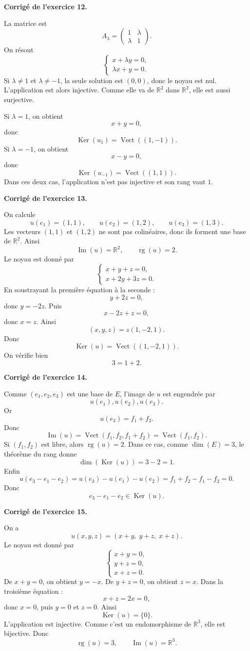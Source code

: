 \documentclass[11pt,a4paper]{article}
\newcommand{\corr}[1]{
    \vspace{0.4cm}
    \noindent\textbf{\textcolor{bleuprepa}{Corrigé de l'exercice #1.}}
    \par\vspace{0.1cm}
}
\newcommand{\R}{\mathbb{R}}
\newcommand{\Ker}{\operatorname{Ker}}
\newcommand{\Img}{\operatorname{Im}}
\newcommand{\rg}{\operatorname{rg}}
\newcommand{\Vect}{\operatorname{Vect}}
\begin{document}
\corr{12}
La matrice est
\[
A_\lambda=
\begin{pmatrix}
1&\lambda\\
\lambda&1
\end{pmatrix}.
\]
On résout
\[
\begin{cases}
x+\lambda y=0,\\
\lambda x+y=0.
\end{cases}
\]
Si $\lambda\neq 1$ et $\lambda\neq -1$, la seule solution est $(0,0)$, donc le noyau est nul. L'application est alors injective. Comme elle va de $\R^2$ dans $\R^2$, elle est aussi surjective.

Si $\lambda=1$, on obtient
\[
x+y=0,
\]
donc
\[
\Ker(u_1)=\Vect((1,-1)).
\]
Si $\lambda=-1$, on obtient
\[
x-y=0,
\]
donc
\[
\Ker(u_{-1})=\Vect((1,1)).
\]
Dans ces deux cas, l'application n'est pas injective et son rang vaut $1$.

\corr{13}
On calcule
\[
u(e_1)=(1,1),\qquad u(e_2)=(1,2),\qquad u(e_3)=(1,3).
\]
Les vecteurs $(1,1)$ et $(1,2)$ ne sont pas colinéaires, donc ils forment une base de $\R^2$. Ainsi
\[
\Img(u)=\R^2,\qquad \rg(u)=2.
\]
Le noyau est donné par
\[
\begin{cases}
x+y+z=0,\\
x+2y+3z=0.
\end{cases}
\]
En soustrayant la première équation à la seconde :
\[
y+2z=0,
\]
donc $y=-2z$. Puis
\[
x-2z+z=0,
\]
donc $x=z$. Ainsi
\[
(x,y,z)=z(1,-2,1).
\]
Donc
\[
\Ker(u)=\Vect((1,-2,1)).
\]
On vérifie bien
\[
3=1+2.
\]

\corr{14}
Comme $(e_1,e_2,e_3)$ est une base de $E$, l'image de $u$ est engendrée par
\[
u(e_1),u(e_2),u(e_3).
\]
Or
\[
u(e_3)=f_1+f_2.
\]
Donc
\[
\Img(u)=\Vect(f_1,f_2,f_1+f_2)=\Vect(f_1,f_2).
\]
Si $(f_1,f_2)$ est libre, alors $\rg(u)=2$. Dans ce cas, comme $\dim(E)=3$, le théorème du rang donne
\[
\dim(\Ker(u))=3-2=1.
\]
Enfin
\[
u(e_3-e_1-e_2)=u(e_3)-u(e_1)-u(e_2)=f_1+f_2-f_1-f_2=0.
\]
Donc
\[
e_3-e_1-e_2\in\Ker(u).
\]

\corr{15}
On a
\[
u(x,y,z)=(x+y,\;y+z,\;x+z).
\]
Le noyau est donné par
\[
\begin{cases}
x+y=0,\\
y+z=0,\\
x+z=0.
\end{cases}
\]
De $x+y=0$, on obtient $y=-x$. De $y+z=0$, on obtient $z=x$. Dans la troisième équation :
\[
x+z=2x=0,
\]
donc $x=0$, puis $y=0$ et $z=0$. Ainsi
\[
\Ker(u)=\{0\}.
\]
L'application est injective. Comme c'est un endomorphisme de $\R^3$, elle est bijective. Donc
\[
\rg(u)=3,\qquad \Img(u)=\R^3.
\]
\end{document}
